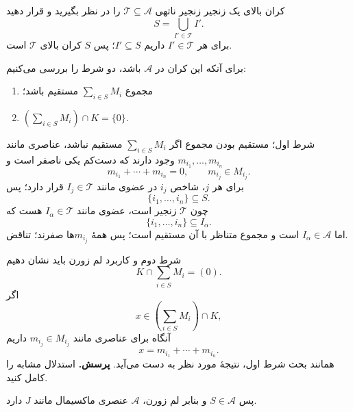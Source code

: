 \begin{frame}[t]{کران بالای یک زنجیر}
    \label{lec05:complement-chain-bound}
    زنجیر ناتهی $\mathcal{T}\subseteq\mathcal{A}$ را در نظر بگیرید و قرار دهید
    \[
        S=\bigcup_{I'\in\mathcal{T}}I'.
    \]
    برای هر $I'\in\mathcal{T}$ داریم $I'\subseteq S$؛
    پس $S$ کران بالای $\mathcal{T}$ است.

    برای آنکه این کران در $\mathcal{A}$ باشد، دو شرط را بررسی می‌کنیم:
    \begin{enumerate}
        \item مجموع $\sum_{i\in S}M_i$ مستقیم باشد؛
        \item $\left(\sum_{i\in S}M_i\right)\cap K=\{0\}$.
    \end{enumerate}
\end{frame}

\begin{frame}[t]{شرط اول؛ مستقیم بودن مجموع}
    \label{lec05:chain-sum-direct}
    اگر $\sum_{i\in S}M_i$ مستقیم نباشد، عناصری مانند
    $m_{i_1},\ldots,m_{i_n}$ وجود دارند که \alert{دست‌کم یکی ناصفر} است و
    \[
        m_{i_1}+\cdots+m_{i_n}=0,
        \qquad m_{i_j}\in M_{i_j}.
    \]
    برای هر $j$، شاخص $i_j$ در عضوی مانند $I_j\in\mathcal{T}$ قرار دارد؛ پس
    \[
        \{i_1,\ldots,i_n\}\subseteq S.
    \]
    چون $\mathcal{T}$ زنجیر است، عضوی مانند $I_\alpha\in\mathcal{T}$ هست که
    \[
        \{i_1,\ldots,i_n\}\subseteq I_\alpha.
    \]
    اما $I_\alpha\in\mathcal{A}$ است و مجموع متناظر با آن مستقیم است؛
    پس همهٔ $m_{i_j}$ها صفرند؛ تناقض.
\end{frame}

\begin{frame}[t]{شرط دوم و کاربرد لم زورن}
    \label{lec05:chain-disjoint-zorn}
    باید نشان دهیم
    \[
        K\cap\sum_{i\in S}M_i=(0).
    \]
    اگر
    \[
        x\in\left(\sum_{i\in S}M_i\right)\cap K,
    \]
    آنگاه برای عناصری مانند $m_{i_j}\in M_{i_j}$ داریم
    \[
        x=m_{i_1}+\cdots+m_{i_n}.
    \]
    همانند بحث شرط اول، نتیجهٔ مورد نظر به دست می‌آید.
    \textbf{پرسش.} استدلال مشابه را کامل کنید.

    پس $S\in\mathcal{A}$ و بنابر لم زورن،
    $\mathcal{A}$ عنصری ماکسیمال مانند $J$ دارد.
\end{frame}

